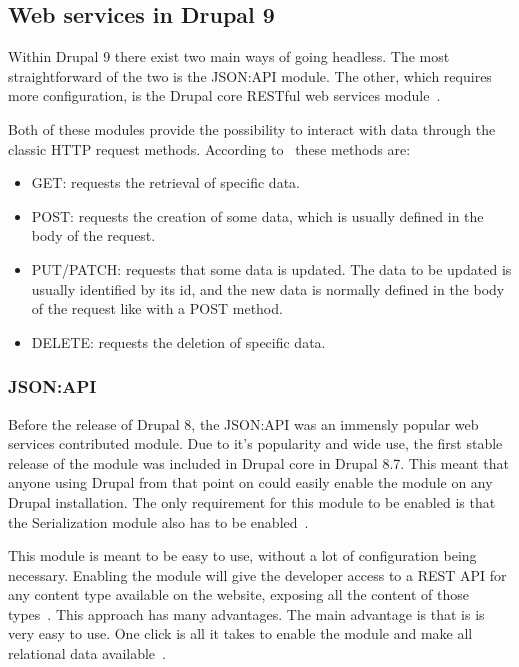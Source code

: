
\subsection{Web services in Drupal 9}
Within Drupal 9 there exist two main ways of going headless. The most straightforward of the two is the JSON:API module. The other, which requires more configuration, is the Drupal core RESTful web services module~\autocite{Drupal2018}. 

Both of these modules provide the possibility to interact with data through the classic HTTP request methods. According to~\autocite{Wilde2011} these methods are: 

\begin{itemize}
	\item GET: requests the retrieval of specific data.
	\item POST: requests the creation of some data, which is usually defined in the body of the request.
	\item PUT/PATCH: requests that some data is updated. The data to be updated is usually identified by its id, and the new data is normally defined in the body of the request like with a POST method.
	\item DELETE: requests the deletion of specific data.
\end{itemize}

\subsubsection{JSON:API}
\label{sss:JSONAPI}

Before the release of Drupal 8, the JSON:API was an immensly popular web services contributed module. Due to it's popularity and wide use, the first stable release of the module was included in Drupal core in Drupal 8.7. This meant that anyone using Drupal from that point on could easily enable the module on any Drupal installation. The only requirement for this module to be enabled is that the Serialization module also has to be enabled~\autocite{Drupal2019}.

This module is meant to be easy to use, without a lot of configuration being necessary. Enabling the module will give the developer access to a REST API for any content type available on the website, exposing all the content of those types~\autocite{So2018}. This approach has many advantages. The main advantage is that is is very easy to use. One click is all it takes to enable the module and make all relational data available~\autocite{So2018}.

